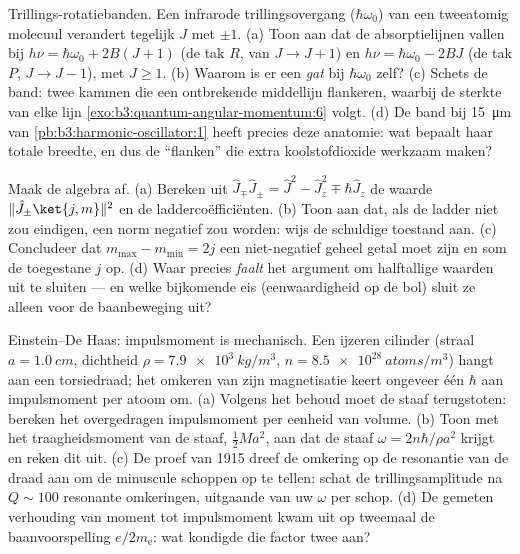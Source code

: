 \begin{exercise}[$\star\star\star$]\label{exo:b3:quantum-angular-momentum:10}
Trillings-rotatiebanden. Een infrarode trillingsovergang ($\hbar\omega_0$)
van een tweeatomig molecuul verandert tegelijk $J$ met $\pm1$. (a) Toon
aan dat de absorptielijnen vallen bij $h\nu =
\hbar\omega_0 + 2B(J+1)$ (de
tak $R$, van $J \to J+1$) en $h\nu = \hbar\omega_0 - 2BJ$ (de tak $P$, $J \to J-1$), met $J \ge
1$. (b) Waarom is er een \emph{gat} bij
$\hbar\omega_0$ zelf? (c) Schets de band: twee kammen die een ontbrekende
middellijn flankeren, waarbij de sterkte van elke lijn
\cref{exo:b3:quantum-angular-momentum:6} volgt. (d) De band bij
\qty{15}{\micro m} van \cref{pb:b3:harmonic-oscillator:1} heeft precies
deze anatomie: wat bepaalt haar totale breedte, en dus de ``flanken'' die
extra koolstofdioxide werkzaam maken?
\end{exercise}

\begin{exercise}[$\star\star\star$]\label{exo:b3:quantum-angular-momentum:11}
Maak de algebra af. (a) Bereken uit $\hat J_\mp\hat J_\pm = \hat J^2 -
\hat J_z^2 \mp \hbar\hat J_z$ de waarde $\|\hat J_\pm\ket{j,m}\|^2$ en de
laddercoëfficiënten. (b) Toon aan dat, als de ladder niet zou eindigen,
een norm negatief zou worden: wijs de schuldige toestand aan. (c)
Concludeer dat $m_{\max} - m_{\min} = 2j$ een niet-negatief geheel getal
moet zijn en som de toegestane $j$ op. (d) Waar precies \emph{faalt} het
argument om halftallige waarden uit te sluiten --- en welke bijkomende eis
(eenwaardigheid op de bol) sluit ze alleen voor de baanbeweging uit?
\end{exercise}

\begin{exercise}[$\star\star\star$]\label{exo:b3:quantum-angular-momentum:12}
Einstein--De Haas: impulsmoment is mechanisch. Een ijzeren cilinder
(straal $a = \qty{1.0}{cm}$, dichtheid $\rho = \qty{7.9e3}{kg/m^3}$, $n = \qty{8.5e28}{atoms/m^3}$) hangt aan een torsiedraad; het omkeren van zijn
magnetisatie keert ongeveer één $\hbar$ aan impulsmoment per atoom om. (a)
Volgens het behoud moet de staaf terugstoten: bereken het overgedragen
impulsmoment per eenheid van volume. (b) Toon met het traagheidsmoment van de staaf, $\tfrac12 M
a^2$, aan dat
de staaf $\omega = 2n\hbar/\rho a^2$ krijgt en reken dit uit. (c) De proef
van 1915 dreef de omkering op de resonantie van de draad aan om de
minuscule schoppen op te tellen: schat de trillingsamplitude na $Q \sim 100$ resonante omkeringen, uitgaande van uw $\omega$ per schop. (d) De
gemeten verhouding van moment tot impulsmoment kwam uit op tweemaal de
baanvoorspelling $e/2m_{\text{e}}$: wat kondigde die factor twee aan?
\end{exercise}


